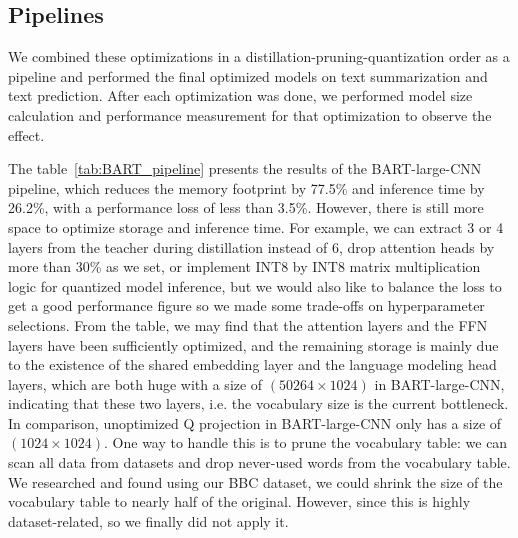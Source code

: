 \subsection{Pipelines}
We combined these optimizations in a distillation-pruning-quantization order as a pipeline and performed the final optimized models on text summarization and text prediction. After each optimization was done, we performed model size calculation and performance measurement for that optimization to observe the effect.

The table~\ref{tab:BART_pipeline} presents the results of the BART-large-CNN pipeline, which reduces the memory footprint by 77.5\% and inference time by 26.2\%, with a performance loss of less than 3.5\%. However, there is still more space to optimize storage and inference time. For example, we can extract 3 or 4 layers from the teacher during distillation instead of 6, drop attention heads by more than 30\% as we set, or implement INT8 by INT8 matrix multiplication logic for quantized model inference, but we would also like to balance the loss to get a good performance figure so we made some trade-offs on hyperparameter selections. From the table, we may find that the attention layers and the FFN layers have been sufficiently optimized, and the remaining storage is mainly due to the existence of the shared embedding layer and the language modeling head layers, which are both huge with a size of $(50264 \times 1024)$ in BART-large-CNN, indicating that these two layers, i.e. the vocabulary size is the current bottleneck. In comparison, unoptimized Q projection in BART-large-CNN only has a size of $(1024 \times 1024)$. One way to handle this is to prune the vocabulary table: we can scan all data from datasets and drop never-used words from the vocabulary table. We researched and found using our BBC dataset, we could shrink the size of the vocabulary table to nearly half of the original. However, since this is highly dataset-related, so we finally did not apply it.

